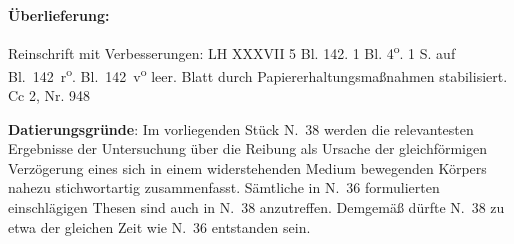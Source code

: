 \begin{ledgroupsized}[r]{120mm}
\footnotesize 
\pstart 
\noindent\textbf{\"{U}berlieferung:}
\pend
\end{ledgroupsized}
\begin{ledgroupsized}[r]{114mm}
\footnotesize 
\pstart \parindent -6mm
Reinschrift mit Verbesserungen:
LH XXXVII 5 Bl. 142.
1 Bl. 4\textsuperscript{o}.
1 S. auf Bl.~142~r\textsuperscript{o}. Bl.~142~v\textsuperscript{o} leer.
Blatt durch Papiererhaltungsma{\ss}nahmen stabilisiert.%
\\Cc 2, Nr. 948 
\pend
\end{ledgroupsized}

\vspace*{5mm}
\begin{ledgroup}
\footnotesize 
\pstart
\noindent\footnotesize{\textbf{Datierungsgr\"{u}nde}: Im vorliegenden St\"{u}ck N.~38 werden die relevantesten Ergebnisse der Untersuchung \"{u}ber die Reibung als Ursache der gleichförmigen Verz\"{o}gerung eines sich in einem widerstehenden Medium bewegenden K\"{o}rpers nahezu stichwortartig zusammenfasst.
S\"{a}mtliche in N.~36 formulierten einschl\"{a}gigen Thesen sind auch in N.~38 anzutreffen.
Demgemäß d\"{u}rfte N.~38 zu etwa der gleichen Zeit wie N.~36 entstanden sein.}
\pend
\end{ledgroup}

